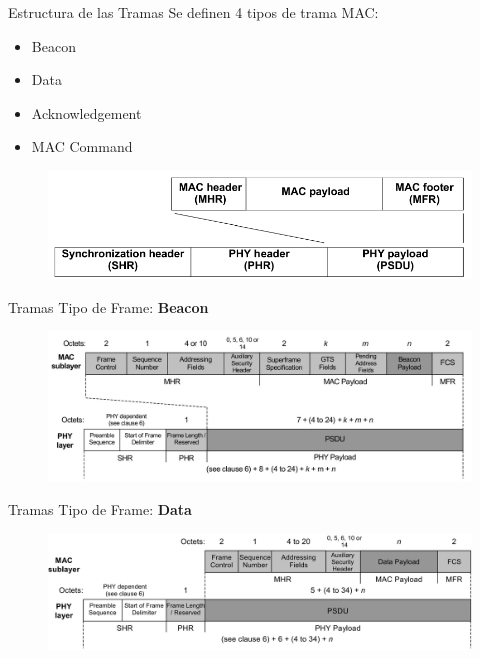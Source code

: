 \documentclass[aspectratio=169, handout]{beamer}
\begin{document}
\begin{frame}{Estructura de las Tramas}
Se definen 4 tipos de trama MAC:
\vspace{5px}
	\begin{itemize}
		\item Beacon
		\vspace{5px}
		\item Data
		\vspace{5px}
		\item Acknowledgement
		\vspace{5px}
		\item MAC Command
		\vspace{5px}
	\end{itemize}
	\begin{figure}[H]
		\includegraphics[width=.8\textwidth]{./imagenes/frameStructure}
	\end{figure}	 	
\end{frame}

\begin{frame}[t]{Tramas}
Tipo de Frame: \textbf{Beacon}
\vspace{10px}
	\begin{figure}[H]
		\includegraphics[width=1\textwidth]{./imagenes/beacon.jpg}
	\end{figure}	  	  	
\end{frame}

\begin{frame}[t]{Tramas}
Tipo de Frame: \textbf{Data}
\vspace{10px}
	\begin{figure}[H]
		\includegraphics[width=1\textwidth]{./imagenes/data.jpg}
	\end{figure}	  	  	
\end{frame}
\end{document}

